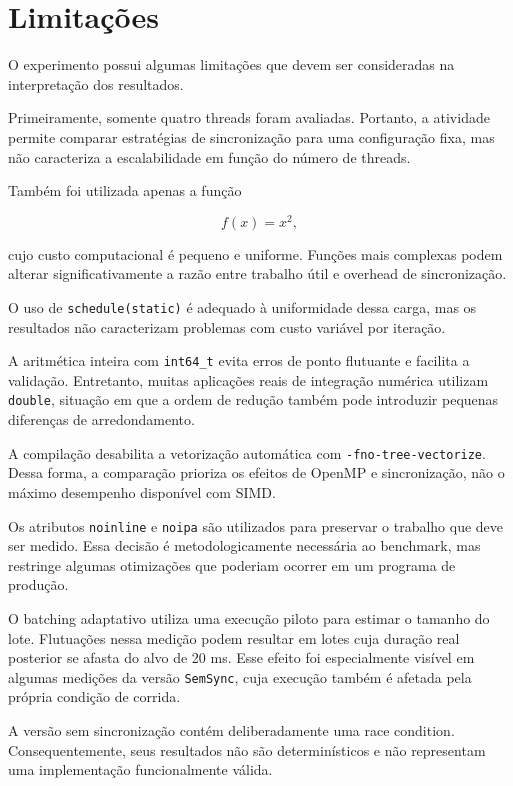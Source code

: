 \section{Limitações}

\label{sec:atvd06-limitacoes}

O experimento possui algumas limitações que devem ser consideradas na
interpretação dos resultados.

Primeiramente, somente quatro threads foram avaliadas. Portanto, a atividade
permite comparar estratégias de sincronização para uma configuração fixa,
mas não caracteriza a escalabilidade em função do número de threads.

Também foi utilizada apenas a função

\begin{equation}
    f(x)=x^2,
\end{equation}

cujo custo computacional é pequeno e uniforme. Funções mais complexas podem
alterar significativamente a razão entre trabalho útil e overhead de
sincronização.

O uso de \texttt{schedule(static)} é adequado à uniformidade dessa carga,
mas os resultados não caracterizam problemas com custo variável por
iteração.

A aritmética inteira com \texttt{int64\_t} evita erros de ponto flutuante e
facilita a validação. Entretanto, muitas aplicações reais de integração
numérica utilizam \texttt{double}, situação em que a ordem de redução também
pode introduzir pequenas diferenças de arredondamento.

A compilação desabilita a vetorização automática com
\texttt{-fno-tree-vectorize}. Dessa forma, a comparação prioriza os efeitos
de OpenMP e sincronização, não o máximo desempenho disponível com SIMD.

Os atributos \texttt{noinline} e \texttt{noipa} são utilizados para
preservar o trabalho que deve ser medido. Essa decisão é metodologicamente
necessária ao benchmark, mas restringe algumas otimizações que poderiam
ocorrer em um programa de produção.

O batching adaptativo utiliza uma execução piloto para estimar o tamanho do
lote. Flutuações nessa medição podem resultar em lotes cuja duração real
posterior se afasta do alvo de 20 ms. Esse efeito foi especialmente visível
em algumas medições da versão \texttt{SemSync}, cuja execução também é
afetada pela própria condição de corrida.

A versão sem sincronização contém deliberadamente uma race condition.
Consequentemente, seus resultados não são determinísticos e não representam
uma implementação funcionalmente válida.

